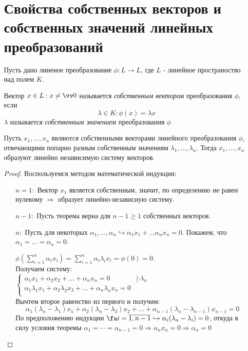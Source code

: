\section{Свойства собственных векторов и собственных значений линейных преобразований}
  Пусть дано линеное преобразование $\phi: L \rightarrow L$, где $L$ - линейное пространоство над полем $K$.
  \begin{defn}
  Вектор $x \in L: x \neq \vv 0$ называется \textit{собственным вектором} преобразования $\phi$, если 
  \begin{equation}
    \lambda \in K: \phi(x)=\lambda x
  \end{equation}
$\lambda$ называется \textit{собственным значением} преобразования $\phi$ 
  \end{defn}
  \begin{thm}
  Пусть $x_1,...,x_n$ являются собственными векторами линейного преобразования $\phi$, отвечающими попарно разным собственным значениям $\lambda_1,...,\lambda_n$. Тогда $x_1,...,x_n$ образуют линейно независимую систему векторов.
  \end{thm}
  \begin{proof}
  Воспользуемся методом математической индукции:
  \linebreak\vspace*{-\baselineskip}
  \begin{itemize}
  \item[\underline{$n=1:$}] Вектор $x_1$ является собственным, значит, по определению не равен нулевому $\Rightarrow$ образует линейно-независиую систему.
  \item[\underline{$n-1:$}] Пусть теорема верна для $n-1\ge 1$ собственных векторов.
  
  \item[\underline{$n:$}] Пусть для некоторых $\alpha_1,...,\alpha_n \hookrightarrow \alpha_1 x_1 + \ldots \alpha_n x_n = 0$. Покажем, что $\alpha_1=\ldots=\alpha_n=0$.
  
  $\phi(\sum_{i=1}^n \alpha_i x_i)=\sum_{i=1}^n \alpha_i \lambda_i x_i = \phi(0)=0$. \\
  Получаем систему: \\
  $\begin{cases}
    \alpha_1 x_1 + \alpha_2 x_2 + \ldots + \alpha_n x_n = 0 & |\cdot \lambda_n \\
    \alpha_1 \lambda_1 x_1 + \alpha_2 \lambda_2 x_2 + \ldots + \alpha_n \lambda_n x_n = 0 \\
  \end{cases}$ \\
  Вычтем второе равенство из первого и получим:
  \begin{equation*}
  \alpha_1 (\lambda_n-\lambda_1) x_1 + \alpha_2 (\lambda_n-\lambda_2) x_2 + \ldots + \alpha_{n-1} (\lambda_n-\lambda_{n-1}) x_{n-1} = 0
  \end{equation*}
  По предположению индукции $\fa i=\overline{1,n-1} \hookrightarrow \alpha_i(\lambda_n-\lambda_i)=0$, откуда в силу условия теоремы $\alpha_1=\cdots=\alpha_{n-1}=0 \Rightarrow \alpha_n x_n=0 \Rightarrow \alpha_n=0$
  \end{itemize}
  \vspace{-1.65\baselineskip}
  \end{proof}
